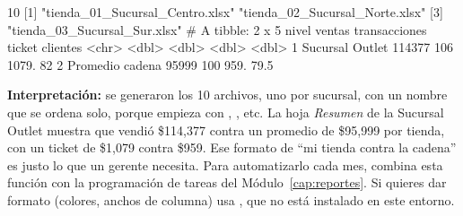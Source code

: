\begin{rsalida}
[1] 10
[1] "tienda_01_Sucursal_Centro.xlsx" "tienda_02_Sucursal_Norte.xlsx" 
[3] "tienda_03_Sucursal_Sur.xlsx"   
# A tibble: 2 x 5
  nivel           ventas transacciones ticket clientes
  <chr>            <dbl>         <dbl>  <dbl>    <dbl>
1 Sucursal Outlet 114377           106  1079.     82  
2 Promedio cadena  95999           100   959.     79.5
\end{rsalida}

\textbf{Interpretación:} se generaron los 10 archivos, uno por sucursal,
con un nombre que se ordena solo, porque empieza con
, , etc. La hoja
\emph{Resumen} de la Sucursal Outlet muestra que vendió \$114,377 contra un
promedio de \$95,999 por tienda, con un ticket de \$1,079 contra \$959. Ese
formato de ``mi tienda contra la cadena'' es justo lo que un gerente
necesita. Para automatizarlo cada mes, combina esta función con la
programación de tareas del Módulo~\ref{cap:reportes}. Si quieres dar formato
(colores, anchos de columna) usa , que no está instalado
en este entorno.

